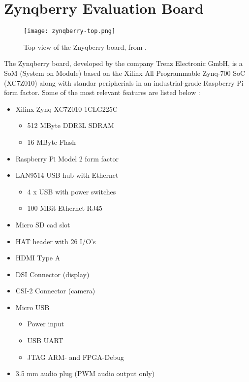 
\chapter{Zynqberry Evaluation Board}

\begin{figure}
	\centering
	\texttt{[image: zynqberry-top.png]}
	\caption{Top view of the Znyqberry board, from \cite{zynq-main}.} \label{fig:znyqtop}
\end{figure}

The Zynqberry board, developed by the company Trenz Electronic GmbH, is a SoM (System on Module) based on the Xilinx All Programmable Zynq-700 SoC (XC7Z010) along with standar peripherials in an industrial-grade Raspberry Pi form factor. Some of the most relevant features are listed below \cite{zynq-main}:

\begin{itemize}
	\item Xilinx Zynq XC7Z010-1CLG225C
	\begin{itemize}
		\item 512 MByte DDR3L SDRAM
		\item 16 MByte Flash
	\end{itemize}
	\item Raspberry Pi Model 2 form factor
	\item LAN9514 USB hub with Ethernet
	\begin{itemize}
		\item 4 x USB with power switches
		\item 100 MBit Ethernet RJ45
	\end{itemize}
	\item Micro SD cad slot
	\item HAT header with 26 I/O's
	\item HDMI Type A
	\item DSI Connector (display)
	\item CSI-2 Connector (camera)
	\item Micro USB
	\begin{itemize}
		\item Power input
		\item USB UART
		\item JTAG ARM- and FPGA-Debug
	\end{itemize}
	\item 3.5 mm audio plug (PWM audio output only)
\end{itemize}

